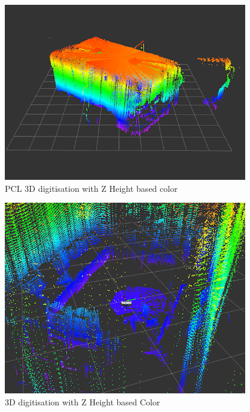 \documentclass[Afour,sageh,times]{sagej}
\begin{document}
\begin{figure}
    \centering
    \includegraphics[scale=20]{Resultat1.png}
    \caption{PCL 3D digitisation with Z Height based color}
    \label{fig:Resultat1}
\end{figure}
\begin{figure}
    \centering
    \includegraphics[scale=20]{Resultat3.png}
    \caption{3D digitisation with Z Height based Color}
    \label{fig:Resultat3}
\end{figure}
\end{document}
